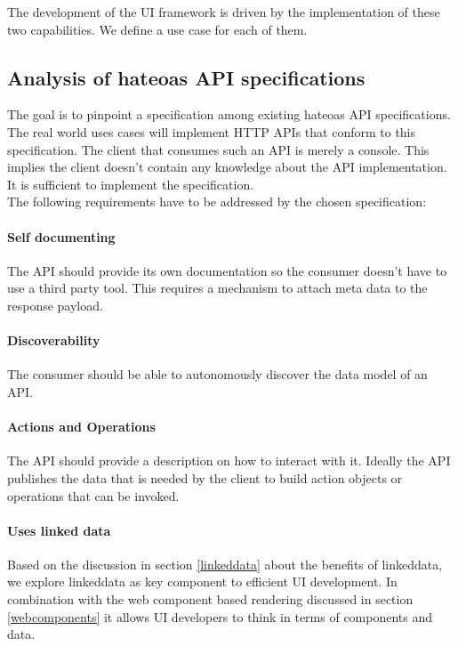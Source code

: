 The development of the UI framework is driven by the implementation of these two capabilities. We define a use case for each of them.

\subsection{Analysis of \gls{hateoas} API specifications}
The goal is to pinpoint a specification among existing \gls{hateoas} API specifications. The real world uses cases will implement HTTP APIs that conform to this specification. The client that consumes such an API is merely a console. This implies the client doesn't contain any knowledge about the API implementation. It is sufficient to implement the specification. \\
The following requirements have to be addressed by the chosen specification:

\paragraph{Self documenting}
The API should provide its own documentation so the consumer doesn't have to use a third party tool. This requires a mechanism to attach meta data to the response payload.

\paragraph{Discoverability}
The consumer should be able to autonomously discover the data model of an API.

\paragraph{Actions and Operations}
The API should provide a description on how to interact with it. Ideally the API publishes the data that is needed by the client to build action objects or operations that can be invoked.

\paragraph{Uses linked data}
Based on the discussion in section \ref{linkeddata} about the benefits of \gls{linkeddata}, we explore \gls{linkeddata} as key component to efficient UI development. In combination with the web component based rendering discussed in section \ref{webcomponents} it allows UI developers to think in terms of components and data.

